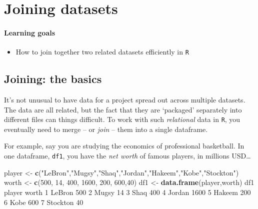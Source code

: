 \documentclass[
]{book}
\newenvironment{Shaded}{\begin{snugshade}}{\end{snugshade}}
\newcommand{\DecValTok}[1]{\textcolor[rgb]{0.00,0.00,0.81}{#1}}
\newcommand{\KeywordTok}[1]{\textcolor[rgb]{0.13,0.29,0.53}{\textbf{#1}}}
\newcommand{\NormalTok}[1]{#1}
\newcommand{\StringTok}[1]{\textcolor[rgb]{0.31,0.60,0.02}{#1}}
\providecommand{\tightlist}{%
  \setlength{\itemsep}{0pt}\setlength{\parskip}{0pt}}
\begin{document}
\hypertarget{joining-datasets}{%
\chapter{Joining datasets}\label{joining-datasets}}

\hypertarget{learning-goals-11}{%
\subsubsection*{Learning goals}\label{learning-goals-11}}

\begin{itemize}
\tightlist
\item
  How to join together two related datasets efficiently in \texttt{R}
\end{itemize}

\hypertarget{joining-the-basics}{%
\section*{Joining: the basics}\label{joining-the-basics}}

It's not unusual to have data for a project spread out across multiple datasets. The data are all related, but the fact that they are `packaged' separately into different files can things difficult. To work with such \emph{relational} data in \texttt{R}, you eventually need to merge -- or \emph{join} -- them into a single dataframe.

For example, say you are studying the economics of professional basketball. In one dataframe, \texttt{df1}, you have the \emph{net worth} of famous players, in millions USD\ldots{}

\begin{Shaded}
\begin{Highlighting}[]
\NormalTok{player <-}\StringTok{ }\KeywordTok{c}\NormalTok{(}\StringTok{"LeBron"}\NormalTok{,}\StringTok{"Mugsy"}\NormalTok{,}\StringTok{"Shaq"}\NormalTok{,}\StringTok{"Jordan"}\NormalTok{,}\StringTok{"Hakeem"}\NormalTok{,}\StringTok{"Kobe"}\NormalTok{,}\StringTok{"Stockton"}\NormalTok{)}
\NormalTok{worth <-}\StringTok{ }\KeywordTok{c}\NormalTok{(}\DecValTok{500}\NormalTok{, }\DecValTok{14}\NormalTok{, }\DecValTok{400}\NormalTok{, }\DecValTok{1600}\NormalTok{, }\DecValTok{200}\NormalTok{, }\DecValTok{600}\NormalTok{,}\DecValTok{40}\NormalTok{)}
\NormalTok{df1 <-}\StringTok{ }\KeywordTok{data.frame}\NormalTok{(player,worth)}
\NormalTok{df1}
\NormalTok{    player worth}
\DecValTok{1}\NormalTok{   LeBron   }\DecValTok{500}
\DecValTok{2}\NormalTok{    Mugsy    }\DecValTok{14}
\DecValTok{3}\NormalTok{     Shaq   }\DecValTok{400}
\DecValTok{4}\NormalTok{   Jordan  }\DecValTok{1600}
\DecValTok{5}\NormalTok{   Hakeem   }\DecValTok{200}
\DecValTok{6}\NormalTok{     Kobe   }\DecValTok{600}
\DecValTok{7}\NormalTok{ Stockton    }\DecValTok{40}
\end{Highlighting}
\end{Shaded}
\end{document}
